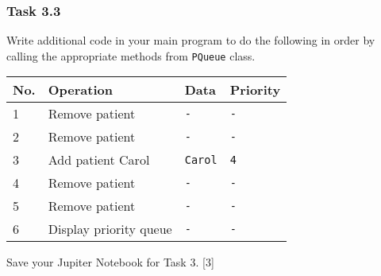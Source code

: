 \subsubsection*{Task 3.3 }

Write additional code in your main program to do the following in
order by calling the appropriate methods from \texttt{PQueue} class. 
\noindent \begin{center}
\begin{tabular}{|l|l|l|l|}
\hline 
No.  & Operation  & Data  & Priority\tabularnewline
\hline 
1  & Remove patient & \texttt{-} & \texttt{-}\tabularnewline
\hline 
2  & Remove patient  & \texttt{-} & \texttt{-}\tabularnewline
\hline 
3  & Add patient Carol & \texttt{Carol} & \texttt{4}\tabularnewline
\hline 
4  & Remove patient & \texttt{-} & \texttt{-}\tabularnewline
\hline 
5  & Remove patient & \texttt{-} & \texttt{-}\tabularnewline
\hline 
6  & Display priority queue  & \texttt{- } & \texttt{-}\tabularnewline
\hline 
\end{tabular}
\par\end{center}

Save your Jupiter Notebook for Task 3. \hfill{}{[}3{]}